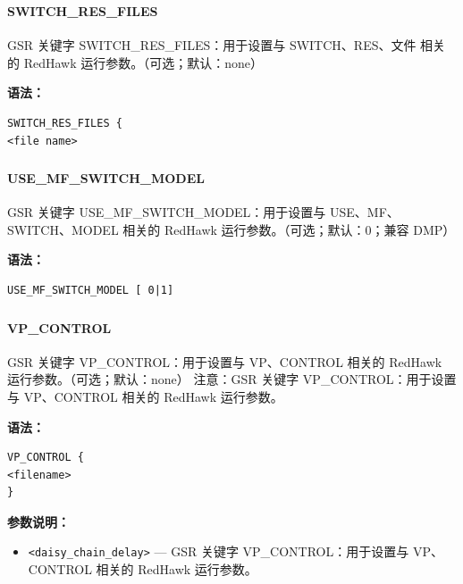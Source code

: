 \subsubsection{}
\paragraph*{SWITCH_RES_FILES}

GSR 关键字 SWITCH_RES_FILES：用于设置与 SWITCH、RES、文件 相关的 RedHawk 运行参数。（可选；默认：none）

\textbf{语法：}
\begin{lstlisting}
SWITCH_RES_FILES {
<file name>
\end{lstlisting}

\subsubsection{}
\paragraph*{USE_MF_SWITCH_MODEL}

GSR 关键字 USE_MF_SWITCH_MODEL：用于设置与 USE、MF、SWITCH、MODEL 相关的 RedHawk 运行参数。（可选；默认：0；兼容 DMP）

\textbf{语法：}
\begin{lstlisting}
USE_MF_SWITCH_MODEL [ 0|1]
\end{lstlisting}

\subsubsection{}
\paragraph*{VP_CONTROL}

GSR 关键字 VP_CONTROL：用于设置与 VP、CONTROL 相关的 RedHawk 运行参数。（可选；默认：none） 注意：GSR 关键字 VP_CONTROL：用于设置与 VP、CONTROL 相关的 RedHawk 运行参数。

\textbf{语法：}
\begin{lstlisting}
VP_CONTROL {
<filename>
}
\end{lstlisting}

\textbf{参数说明：}
\begin{itemize}
\item \texttt{<daisy\_chain\_delay>} — GSR 关键字 VP\_CONTROL：用于设置与 VP、CONTROL 相关的 RedHawk 运行参数。
\end{itemize}


